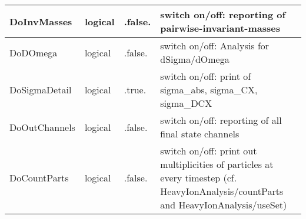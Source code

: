\documentclass{article}
\begin{document}
\begin{longtable}{llll}
\midrule
DoInvMasses & \begin{minipage}[t]{2cm}logical\end{minipage} & \begin{minipage}[t]{2cm}.false.\end{minipage} & \begin{minipage}[t]{12cm}switch on/off: reporting of pairwise-invariant-masses\end{minipage}\\*
\midrule
DoDOmega & \begin{minipage}[t]{2cm}logical\end{minipage} & \begin{minipage}[t]{2cm}.false.\end{minipage} & \begin{minipage}[t]{12cm}switch on/off: Analysis for dSigma/dOmega\end{minipage}\\*
\midrule
DoSigmaDetail & \begin{minipage}[t]{2cm}logical\end{minipage} & \begin{minipage}[t]{2cm}.true.\end{minipage} & \begin{minipage}[t]{12cm}switch on/off: print of sigma\_abs, sigma\_CX, sigma\_DCX\end{minipage}\\*
\midrule
DoOutChannels & \begin{minipage}[t]{2cm}logical\end{minipage} & \begin{minipage}[t]{2cm}.false.\end{minipage} & \begin{minipage}[t]{12cm}switch on/off: reporting of all final state channels\end{minipage}\\*
\midrule
DoCountParts & \begin{minipage}[t]{2cm}logical\end{minipage} & \begin{minipage}[t]{2cm}.false.\end{minipage} & \begin{minipage}[t]{12cm}switch on/off: print out multiplicities of particles at every timestep (cf. HeavyIonAnalysis/countParts and HeavyIonAnalysis/useSet)\end{minipage}\\*
\bottomrule
\end{longtable}
{ }
\end{document}
